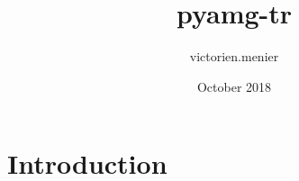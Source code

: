 \documentclass{article}
\title{pyamg-tr}
\author{victorien.menier }
\date{October 2018}
\begin{document}
\maketitle

\section{Introduction}
\end{document}
